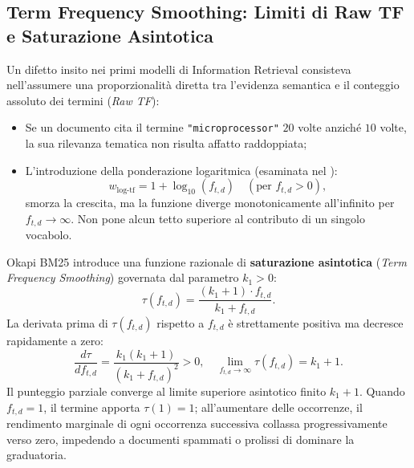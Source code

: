 \FloatBarrier
\subsection{Term Frequency Smoothing: Limiti di Raw TF e Saturazione Asintotica}
\label{subsec:bm25-tf-smoothing}
Un difetto insito nei primi modelli di Information Retrieval consisteva nell'assumere una proporzionalit\`a diretta tra l'evidenza semantica e il conteggio assoluto dei termini (\textit{Raw TF}):
\begin{itemize}
    \item Se un documento cita il termine \texttt{"microprocessor"} $20$ volte anzich\'e $10$ volte, la sua rilevanza tematica non risulta affatto raddoppiata;
    \item L'introduzione della ponderazione logaritmica (esaminata nel ):
    \begin{equation}
    w_{\text{log-tf}} = 1 + \log_{10}(f_{t,d}) \quad (\text{per } f_{t,d} > 0),
    \end{equation}
    smorza la crescita, ma la funzione diverge monotonicamente all'infinito per $f_{t,d} \to \infty$. Non pone alcun tetto superiore al contributo di un singolo vocabolo.
\end{itemize}

Okapi BM25 introduce una funzione razionale di \textbf{saturazione asintotica} (\textit{Term Frequency Smoothing}) governata dal parametro $k_1 > 0$:
\begin{equation}
\tau(f_{t,d}) = \frac{(k_1 + 1) \cdot f_{t,d}}{k_1 + f_{t,d}}.
\label{eq:bm25-saturation-curve}
\end{equation}
La derivata prima di $\tau(f_{t,d})$ rispetto a $f_{t,d}$ \`e strettamente positiva ma decresce rapidamente a zero:
\begin{equation}
\frac{d\tau}{df_{t,d}} = \frac{k_1(k_1 + 1)}{(k_1 + f_{t,d})^2} > 0, \quad \lim_{f_{t,d} \to \infty} \tau(f_{t,d}) = k_1 + 1.
\end{equation}
Il punteggio parziale converge al limite superiore asintotico finito $k_1 + 1$. Quando $f_{t,d} = 1$, il termine apporta $\tau(1) = 1$; all'aumentare delle occorrenze, il rendimento marginale di ogni occorrenza successiva collassa progressivamente verso zero, impedendo a documenti spammati o prolissi di dominare la graduatoria.

